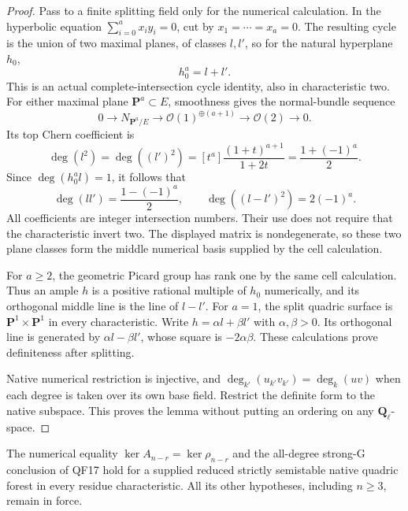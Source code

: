 \begin{proof}
Pass to a finite splitting field only for the numerical
calculation. In the hyperbolic equation
$\sum_{i=0}^a x_i y_i=0$, cut by $x_1=\cdots=x_a=0$.
The resulting cycle is the union of two maximal planes,
of classes $l,l'$, so for the natural hyperplane $h_0$,
\[
                         h_0^a=l+l'.
\]
This is an actual complete-intersection cycle identity,
also in characteristic two. For either maximal plane
$\mathbf P^a\subset E$, smoothness gives the normal-bundle
sequence
\[
 0\longrightarrow N_{\mathbf P^a/E}
   \longrightarrow\mathcal O(1)^{\oplus(a+1)}
   \longrightarrow\mathcal O(2)\longrightarrow0.
\]
Its top Chern coefficient is
\[
 \deg(l^2)=\deg((l')^2)
     =[t^a]\frac{(1+t)^{a+1}}{1+2t}
     =\frac{1+(-1)^a}{2}.
\]
Since $\deg(h_0^a l)=1$, it follows that
\[
       \deg(ll')=\frac{1-(-1)^a}{2},\qquad
       \deg((l-l')^2)=2(-1)^a.
 \tag{C217.3}\label{r17c2:middle-matrix}
\]
All coefficients are integer intersection numbers. Their
use does not require that the characteristic invert two.
The displayed matrix is nondegenerate, so these two plane
classes form the middle numerical basis supplied by the
cell calculation.

For $a\ge2$, the geometric Picard group has rank one by
the same cell calculation. Thus an ample $h$ is a positive
rational multiple of $h_0$ numerically, and its orthogonal
middle line is the line of $l-l'$. For $a=1$, the split
quadric surface is $\mathbf P^1\times\mathbf P^1$ in
every characteristic. Write $h=\alpha l+\beta l'$ with
$\alpha,\beta>0$. Its orthogonal line is generated by
$\alpha l-\beta l'$, whose square is $-2\alpha\beta$.
These calculations prove definiteness after splitting.

Native numerical restriction is injective, and
$\deg_{k'}(u_{k'}v_{k'})=\deg_k(uv)$ when each degree is
taken over its own base field. Restrict the definite form
to the native subspace. This proves the lemma without
putting an ordering on any $\mathbf Q_\ell$-space.
\end{proof}

\begin{proposition}
\label{r17c2:forest}
The numerical equality $\ker A_{n-r}=\ker\rho_{n-r}$ and
the all-degree strong-G conclusion of QF17 hold for a
supplied reduced strictly semistable native quadric forest
in every residue characteristic. All its other hypotheses,
including $n\ge3$, remain in force.
\end{proposition}

